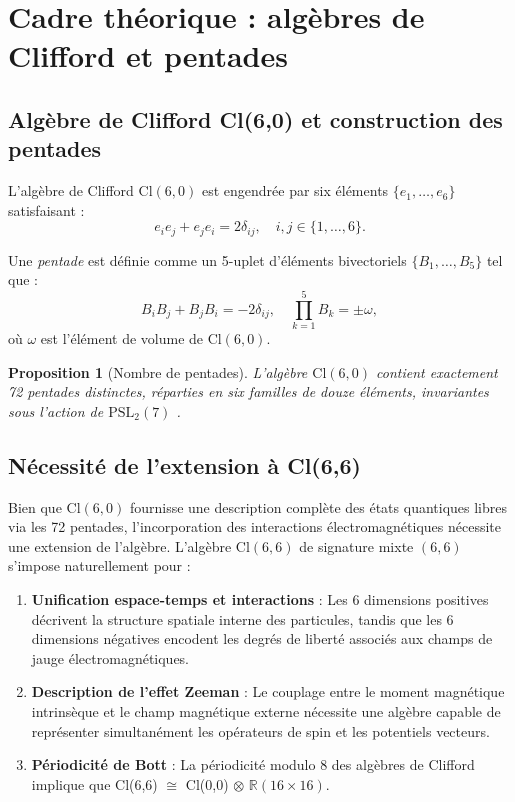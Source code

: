 \documentclass[11pt,a4paper]{article}
\theoremstyle{plain}
\newtheorem{proposition}{Proposition}[section]
\theoremstyle{definition}
\theoremstyle{remark}
\begin{document}
\section{Cadre théorique : algèbres de Clifford et pentades}
\label{sec:theory}

\subsection{Algèbre de Clifford Cl(6,0) et construction des pentades}

L'algèbre de Clifford $\mathrm{Cl}(6,0)$ est engendrée par six éléments $\{e_1,\dots,e_6\}$ satisfaisant :
\begin{equation}
  e_i e_j + e_j e_i = 2\delta_{ij}, \quad i,j \in \{1,\dots,6\}.
\end{equation}

Une \textit{pentade} est définie comme un 5-uplet d'éléments bivectoriels $\{B_1,\dots,B_5\}$ tel que :
\begin{equation}
  B_i B_j + B_j B_i = -2\delta_{ij}, \quad \prod_{k=1}^5 B_k = \pm \omega,
\end{equation}
où $\omega$ est l'élément de volume de $\mathrm{Cl}(6,0)$.

\begin{proposition}[Nombre de pentades]
  L'algèbre $\mathrm{Cl}(6,0)$ contient exactement 72 pentades distinctes, réparties en six familles de douze éléments, invariantes sous l'action de $\mathrm{PSL}_2(7)$ \cite{rowlands2015foundations}.
\end{proposition}

\subsection{Nécessité de l'extension à Cl(6,6)}

Bien que $\mathrm{Cl}(6,0)$ fournisse une description complète des états quantiques libres via les 72 pentades, l'incorporation des interactions électromagnétiques nécessite une extension de l'algèbre. L'algèbre $\mathrm{Cl}(6,6)$ de signature mixte $(6,6)$ s'impose naturellement pour :

\begin{enumerate}
  \item \textbf{Unification espace-temps et interactions} : Les 6 dimensions positives décrivent la structure spatiale interne des particules, tandis que les 6 dimensions négatives encodent les degrés de liberté associés aux champs de jauge électromagnétiques.
  \item \textbf{Description de l'effet Zeeman} : Le couplage entre le moment magnétique intrinsèque et le champ magnétique externe nécessite une algèbre capable de représenter simultanément les opérateurs de spin et les potentiels vecteurs.
  \item \textbf{Périodicité de Bott} : La périodicité modulo 8 des algèbres de Clifford implique que Cl(6,6) $\cong$ Cl(0,0) $\otimes$ $\mathbb{R}(16\times 16)$.
\end{enumerate}
\end{document}
